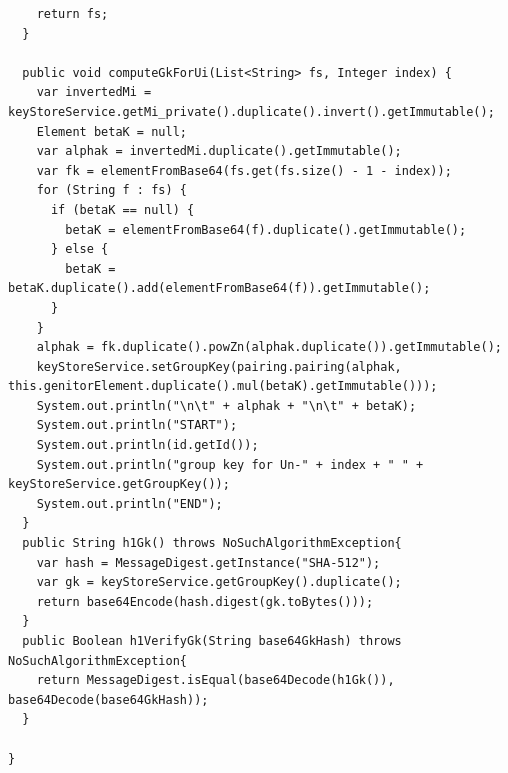 \documentclass[12pt,a4paper]{report}
\begin{document}
\begin{verbatim}
    return fs;
  }

  public void computeGkForUi(List<String> fs, Integer index) {
    var invertedMi = keyStoreService.getMi_private().duplicate().invert().getImmutable();
    Element betaK = null;
    var alphak = invertedMi.duplicate().getImmutable();
    var fk = elementFromBase64(fs.get(fs.size() - 1 - index));
    for (String f : fs) {
      if (betaK == null) {
        betaK = elementFromBase64(f).duplicate().getImmutable();
      } else {
        betaK = betaK.duplicate().add(elementFromBase64(f)).getImmutable();
      }
    }
    alphak = fk.duplicate().powZn(alphak.duplicate()).getImmutable();
    keyStoreService.setGroupKey(pairing.pairing(alphak, this.genitorElement.duplicate().mul(betaK).getImmutable()));
    System.out.println("\n\t" + alphak + "\n\t" + betaK);
    System.out.println("START");
    System.out.println(id.getId());
    System.out.println("group key for Un-" + index + " " + keyStoreService.getGroupKey());
    System.out.println("END");
  }
  public String h1Gk() throws NoSuchAlgorithmException{
    var hash = MessageDigest.getInstance("SHA-512");
    var gk = keyStoreService.getGroupKey().duplicate();
    return base64Encode(hash.digest(gk.toBytes()));
  }
  public Boolean h1VerifyGk(String base64GkHash) throws NoSuchAlgorithmException{
    return MessageDigest.isEqual(base64Decode(h1Gk()), base64Decode(base64GkHash));
  }

}

	
\end{verbatim}
\end{document}
